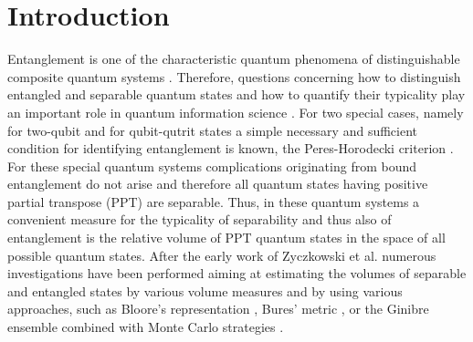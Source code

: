 \documentclass[12pt]{iopart}
\begin{document}
\submitto{\JPA}


\maketitle

\section{Introduction}

Entanglement is one of the characteristic quantum phenomena of distinguishable composite quantum systems \cite{Nielsen,Peres}. Therefore, questions concerning how to distinguish
entangled and separable quantum states and how to quantify their typicality play an important role in quantum information science \cite{Zyczkowski0}. 
For two special cases, namely for two-qubit and for qubit-qutrit states
a simple necessary and sufficient condition for identifying entanglement is known, the Peres-Horodecki criterion \cite{Peresp, Horodecki}. For these special quantum systems complications originating from bound 
entanglement do not arise and therefore all quantum states having positive partial transpose (PPT) are separable. Thus, in these quantum systems a convenient measure for 
the typicality of separability and thus also of entanglement is the relative volume of PPT quantum states in the space of all possible quantum states.  After the early work of Zyczkowski et al. \cite{Zyczkowski1, Zyczkowski2} 
numerous investigations have been performed aiming at estimating the volumes of separable and entangled states by various volume measures 
\cite{Zyczkowski3,Zyczkowski4,Slater1,Slater2,Slater3,Slater4,Shang,Seah,Milz,Lovas,Fei} and by
using various approaches, such as Bloore's representation \cite{Bloore}, Bures' metric \cite{Caves}, or the Ginibre ensemble \cite{GinibreHitRun} combined with Monte Carlo strategies \cite{Liu}.
\end{document}
